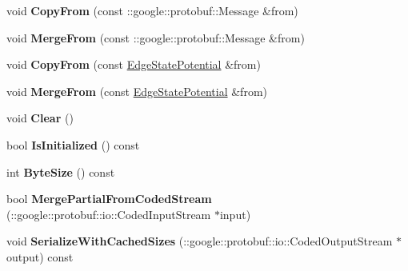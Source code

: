 \begin{DoxyCompactItemize}
\item 
\hypertarget{classgraph_1_1EdgeStatePotential_ac83756fba5134e67c234a0d6f647588d}{
void {\bfseries CopyFrom} (const ::google::protobuf::Message \&from)}
\label{classgraph_1_1EdgeStatePotential_ac83756fba5134e67c234a0d6f647588d}

\item 
\hypertarget{classgraph_1_1EdgeStatePotential_a66c8261423f9120136fb74142cd47483}{
void {\bfseries MergeFrom} (const ::google::protobuf::Message \&from)}
\label{classgraph_1_1EdgeStatePotential_a66c8261423f9120136fb74142cd47483}

\item 
\hypertarget{classgraph_1_1EdgeStatePotential_a8f55d319916f544ccef4671d036dac9e}{
void {\bfseries CopyFrom} (const \hyperlink{classgraph_1_1EdgeStatePotential}{EdgeStatePotential} \&from)}
\label{classgraph_1_1EdgeStatePotential_a8f55d319916f544ccef4671d036dac9e}

\item 
\hypertarget{classgraph_1_1EdgeStatePotential_abff176deb7b6e4934b2d7cd4d4b1bcf0}{
void {\bfseries MergeFrom} (const \hyperlink{classgraph_1_1EdgeStatePotential}{EdgeStatePotential} \&from)}
\label{classgraph_1_1EdgeStatePotential_abff176deb7b6e4934b2d7cd4d4b1bcf0}

\item 
\hypertarget{classgraph_1_1EdgeStatePotential_a83c0c837389b1ae8f84bcb894022ae35}{
void {\bfseries Clear} ()}
\label{classgraph_1_1EdgeStatePotential_a83c0c837389b1ae8f84bcb894022ae35}

\item 
\hypertarget{classgraph_1_1EdgeStatePotential_a6f9a1a9fb84714dee4bf5b4b24494ead}{
bool {\bfseries IsInitialized} () const }
\label{classgraph_1_1EdgeStatePotential_a6f9a1a9fb84714dee4bf5b4b24494ead}

\item 
\hypertarget{classgraph_1_1EdgeStatePotential_a0a60ec89c3fcf88ec83e01bcc5d89279}{
int {\bfseries ByteSize} () const }
\label{classgraph_1_1EdgeStatePotential_a0a60ec89c3fcf88ec83e01bcc5d89279}

\item 
\hypertarget{classgraph_1_1EdgeStatePotential_adfc707ab77b2d69e5ed5f4770ed3f680}{
bool {\bfseries MergePartialFromCodedStream} (::google::protobuf::io::CodedInputStream $\ast$input)}
\label{classgraph_1_1EdgeStatePotential_adfc707ab77b2d69e5ed5f4770ed3f680}

\item 
\hypertarget{classgraph_1_1EdgeStatePotential_ad02fa972c66749f49ce34430af59a2b9}{
void {\bfseries SerializeWithCachedSizes} (::google::protobuf::io::CodedOutputStream $\ast$output) const }
\label{classgraph_1_1EdgeStatePotential_ad02fa972c66749f49ce34430af59a2b9}


\end{DoxyCompactItemize}
